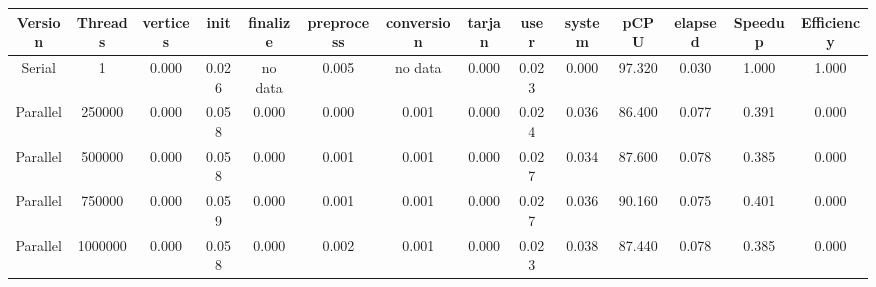 \begin{tabular}{|c|c|c|c|c|c|c|c|c|c|c|c|c|c|}
\toprule
 Version &  Threads &  vertices &  init & finalize &  preprocess & conversion &  tarjan &  user &  system &   pCPU &  elapsed &  Speedup &  Efficiency \\
\midrule
  Serial &        1 &  0.000 & 0.026 &  no data &       0.005 &    no data &   0.000 & 0.023 &   0.000 & 97.320 &    0.030 &    1.000 &       1.000 \\
Parallel &   250000 &  0.000 & 0.058 &    0.000 &       0.000 &      0.001 &   0.000 & 0.024 &   0.036 & 86.400 &    0.077 &    0.391 &       0.000 \\
Parallel &   500000 &  0.000 & 0.058 &    0.000 &       0.001 &      0.001 &   0.000 & 0.027 &   0.034 & 87.600 &    0.078 &    0.385 &       0.000 \\
Parallel &   750000 &  0.000 & 0.059 &    0.000 &       0.001 &      0.001 &   0.000 & 0.027 &   0.036 & 90.160 &    0.075 &    0.401 &       0.000 \\
Parallel &  1000000 &  0.000 & 0.058 &    0.000 &       0.002 &      0.001 &   0.000 & 0.023 &   0.038 & 87.440 &    0.078 &    0.385 &       0.000 \\
\bottomrule
\end{tabular}
